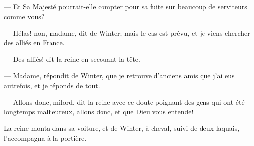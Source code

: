— Et Sa Majesté pourrait-elle compter pour sa fuite sur beaucoup de serviteurs comme vous?

— Hélas! non, madame, dit de Winter; mais le cas est prévu, et je viens chercher des alliés en France.

— Des alliés! dit la reine en secouant la tête.

— Madame, répondit de Winter, que je retrouve d'anciens amis que j'ai eus autrefois, et je réponds de tout.

— Allons donc, milord, dit la reine avec ce doute poignant des gens qui ont été longtemps malheureux, allons donc, et que Dieu vous entende!

La reine monta dans sa voiture, et de Winter, à cheval, suivi de deux laquais, l'accompagna à la portière.